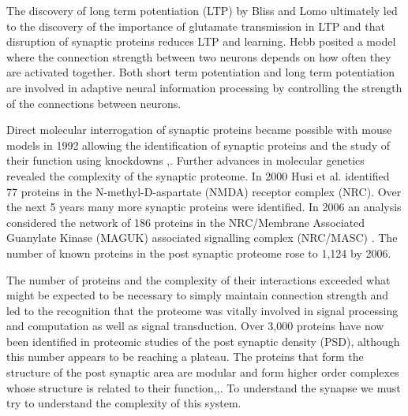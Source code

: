 The discovery of long term potentiation (LTP) by Bliss and Lomo \cite{bliss1973long} ultimately led to the discovery of the importance of glutamate transmission in LTP and that disruption of synaptic proteins reduces LTP and learning. Hebb posited a model where the connection strength between two neurons depends on how often they are activated together.  Both short term potentiation and long term potentiation are involved in adaptive neural information processing by controlling the strength of the connections between neurons\cite{xiao2013adaptive}.

 Direct molecular interrogation of synaptic proteins became possible with mouse models in 1992 allowing the identification of synaptic proteins and the study of their function using knockdowns  \cite{grant1992impaired},\cite{silva1992impaired}. Further advances in molecular genetics revealed the complexity of the synaptic proteome. In 2000 Husi et al. \cite{husi2000proteomic} identified 77 proteins in the N-methyl-D-aspartate (NMDA) receptor complex (NRC). Over the next 5 years many more synaptic proteins were identified. In 2006 an analysis considered the network of 186 proteins in the NRC/Membrane Associated Guanylate Kinase (MAGUK) associated signalling complex (NRC/MASC) \cite{pocklington2006proteomes}. The number of known proteins in the post synaptic proteome rose to 1,124 by 2006\cite{collins2006molecular}.
 
The number of proteins and the complexity of their interactions exceeded what might be expected to be necessary to simply maintain connection strength 
and led to the recognition that the proteome was vitally involved in signal processing and computation as well as signal transduction\cite{grant2018synaptomic}.  Over 3,000 proteins have now been identified in proteomic studies of the post synaptic density (PSD), although this number appears to be reaching a plateau\cite{heil2018systems}. 
The proteins that form the structure of the post synaptic area are modular and form higher order complexes whose structure is related to their function\cite{pocklington2006proteomes},\cite{zhu2016mechanistic},\cite{frank2016nmda}. To understand the synapse we must try to understand the complexity of this system.

